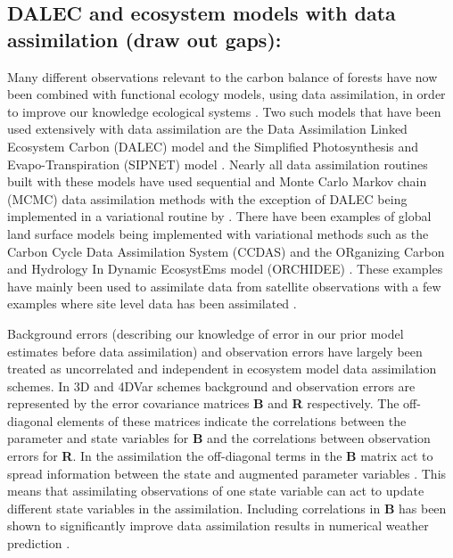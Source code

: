\documentclass[11pt]{article}
\begin{document}
\subsection{DALEC and ecosystem models with data assimilation (draw out gaps):}
Many different observations relevant to the carbon balance of forests have now been combined with functional ecology models, using data assimilation, in order to improve our knowledge ecological systems \citep{zobitz2011primer, fox2009reflex, richardson2010estimating, Quaife2008, Zobitz2014, Niu2014}. Two such models that have been used extensively with data assimilation are the Data Assimilation Linked Ecosystem Carbon (DALEC) model \citep{williams2005improved} and the Simplified Photosynthesis and Evapo-Transpiration (SIPNET) model \citep{braswell2005estimating}. Nearly all data assimilation routines built with these models have used sequential and Monte Carlo Markov chain (MCMC) data assimilation methods with the exception of DALEC being implemented in a variational routine by \citet{delahaies2013regularization}. There have been examples of global land surface models being implemented with variational methods such as the Carbon Cycle Data Assimilation System (CCDAS) \citep{Kaminski2013} and the ORganizing Carbon and Hydrology In Dynamic EcosystEms model (ORCHIDEE) \citep{Krinner2005}. These examples have mainly been used to assimilate data from satellite observations with a few examples where site level data has been assimilated \citep{Verbeeck2011, Bacour2015}.

Background errors (describing our knowledge of error in our prior model estimates before data assimilation) and observation errors have largely been treated as uncorrelated and independent in ecosystem model data assimilation schemes. In 3D and 4DVar schemes background and observation errors are represented by the error covariance matrices \textbf{B} and \textbf{R} respectively. The off-diagonal elements of these matrices indicate the correlations between the parameter and state variables for \textbf{B} and the correlations between observation errors for \textbf{R}. In the assimilation the off-diagonal terms in the \textbf{B} matrix act to spread information between the state and augmented parameter variables \citep{kalnay2003atmospheric}. This means that assimilating observations of one state variable can act to update different state variables in the assimilation. Including correlations in \textbf{B} has been shown to significantly improve data assimilation results in numerical weather prediction \citep{bannister2008review}.
\end{document}
